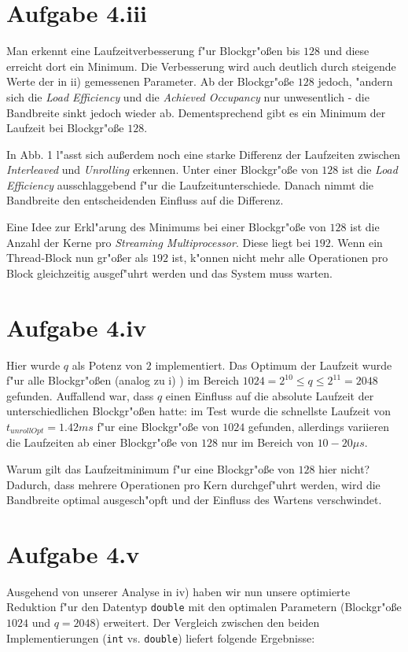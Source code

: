 \documentclass[%
	paper=A4,	%
	pagesize,	%
	DIV=calc,	%
	smallheadings,	%
	ngerman		%
]{scrartcl}
\begin{document}
\section*{Aufgabe 4.iii}
Man erkennt eine Laufzeitverbesserung f"ur Blockgr"o\ss en bis $128$ und diese erreicht dort ein Minimum. Die Verbesserung wird auch deutlich durch steigende Werte der in ii) gemessenen Parameter. Ab der Blockgr"o\ss e $128$ jedoch, "andern sich die \emph{Load Efficiency} und die \emph{Achieved Occupancy} nur unwesentlich - die Bandbreite sinkt jedoch wieder ab. Dementsprechend gibt es ein Minimum der Laufzeit bei Blockgr"o\ss e $128$.

In Abb. 1 l"asst sich au\ss erdem noch eine starke Differenz der Laufzeiten zwischen \emph{Interleaved} und \emph{Unrolling} erkennen. Unter einer Blockgr"o\ss e von $128$ ist die \emph{Load Efficiency} ausschlaggebend f"ur die Laufzeitunterschiede. Danach nimmt die Bandbreite den entscheidenden Einfluss auf die Differenz.

Eine Idee zur Erkl"arung des Minimums bei einer Blockgr"o\ss e von $128$ ist die Anzahl der Kerne pro \emph{Streaming Multiprocessor}. Diese liegt bei $192$. Wenn ein Thread-Block nun gr"o\ss er als $192$ ist, k"onnen nicht mehr alle Operationen pro Block gleichzeitig ausgef"uhrt werden und das System muss warten.

\section*{Aufgabe 4.iv}
Hier wurde $q$ als Potenz von $2$ implementiert. Das Optimum der Laufzeit wurde f"ur  alle Blockgr"o\ss en (analog zu i) ) im Bereich $1024=2^{10}\leq q \leq 2^{11}=2048$ gefunden. Auffallend war, dass $q$ einen Einfluss auf die absolute Laufzeit der unterschiedlichen Blockgr"o\ss en hatte: im Test wurde die schnellste Laufzeit von $t_{unrollOpt}=1.42 ms$ f"ur eine Blockgr"o\ss e von $1024$ gefunden, allerdings variieren die Laufzeiten ab einer Blockgr"o\ss e von $128$ nur im Bereich von $10-20 \mu s$.

Warum gilt das Laufzeitminimum f"ur eine Blockgr"o\ss e von $128$ hier nicht?\\
Dadurch, dass mehrere Operationen pro Kern durchgef"uhrt werden, wird die Bandbreite optimal ausgesch"opft und der Einfluss des \glqq Wartens \grqq verschwindet.

\section*{Aufgabe 4.v}
Ausgehend von unserer Analyse in iv) haben wir nun unsere optimierte Reduktion f"ur den Datentyp \texttt{double} mit den optimalen Parametern (Blockgr"o\ss e $1024$ und $q=2048$) erweitert. Der Vergleich zwischen den beiden Implementierungen (\texttt{int} vs. \texttt{double}) liefert folgende Ergebnisse:
\end{document}

